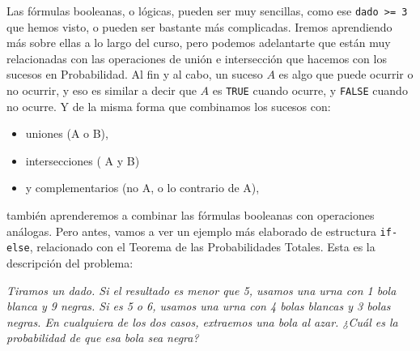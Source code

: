 \documentclass[10pt,a4paper]{article}\usepackage[]{graphicx}\usepackage[]{color}
\newcounter {cont01}
\begin{document}
Las fórmulas booleanas, o lógicas, pueden ser muy sencillas, como ese {\tt dado >= 3} que hemos visto, o pueden ser bastante más complicadas. Iremos aprendiendo más sobre ellas a lo largo del curso, pero podemos adelantarte que están muy relacionadas con las operaciones de unión e intersección que hacemos con los sucesos en Probabilidad. Al fin y al cabo, un suceso $A$ es algo que puede ocurrir o no ocurrir, y eso es similar a decir que $A$ es {\tt TRUE} cuando ocurre, y {\tt FALSE} cuando no ocurre. Y de la misma forma que combinamos los sucesos con:
\begin{itemize}
  \item uniones (A o B),
  \item intersecciones ( A y B)
  \item y complementarios (no A, o lo contrario de A),
\end{itemize}
también aprenderemos a combinar las fórmulas booleanas con operaciones análogas. Pero antes, vamos a ver un ejemplo más elaborado de estructura {\tt if-else}, relacionado con el Teorema de las Probabilidades Totales. Esta es la descripción del problema:

\begin{center}
\begin{minipage}{12cm}
{\em Tiramos un dado. Si el resultado es menor que 5, usamos una urna con 1 bola blanca y 9 negras. Si es 5 o 6, usamos una urna con 4 bolas blancas y 3 bolas negras. En cualquiera de los dos casos, extraemos una bola al azar. ¿Cuál es la probabilidad de que esa bola sea negra?}
\end{minipage}
\end{center}
\end{document}
